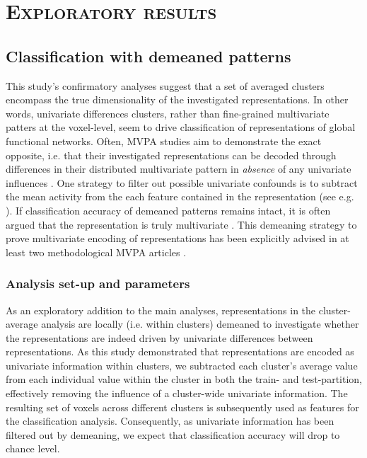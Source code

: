 \documentclass[jou,12pt,a4paper]{apa6}
\begin{document}
\section{\Large \textsc{Exploratory results}}

\subsection{Classification with demeaned patterns}
\noindent This study's confirmatory analyses suggest that a set of averaged clusters encompass the true dimensionality of the investigated representations. In other words, univariate differences clusters, rather than fine-grained multivariate patters at the voxel-level, seem to drive classification of representations of global functional networks. Often, MVPA studies aim to demonstrate the exact opposite, i.e. that their investigated representations can be decoded through differences in their distributed multivariate pattern in \emph{absence} of any univariate influences \cite{davis2013}. One strategy to filter out possible univariate confounds is to subtract the mean activity from the each feature contained in the representation (see e.g. ). If classification accuracy of demeaned patterns remains intact, it is often argued that the representation is truly multivariate \cite{davis2013,davis2014}. This demeaning strategy to prove multivariate encoding of representations has been explicitly advised in at least two methodological MVPA articles \cite{coutanche2013,kriegeskorte2006}. 

\subsubsection{Analysis set-up and parameters}
\noindent As an exploratory addition to the main analyses, representations in the cluster-average analysis are locally (i.e. within clusters) demeaned to investigate whether the representations are indeed driven by univariate differences between representations. As this study demonstrated that representations are encoded as univariate information within clusters, we subtracted each cluster's average value from each individual value within the cluster in both the train- and test-partition, effectively removing the influence of a cluster-wide univariate information. The resulting set of voxels across different clusters is subsequently used as features for the classification analysis. Consequently, as univariate information has been filtered out by demeaning, we expect that classification accuracy will drop to chance level.
\end{document}
